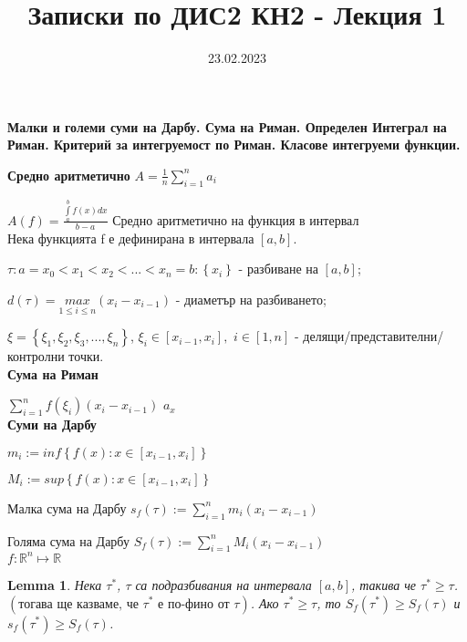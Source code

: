 \documentclass[12pt]{article}
\newtheorem{lemma}{Lemma}
\begin{document}
	\color{white}
	\pagecolor{darkgray}
	\title{Записки по ДИС2 КН2 - Лекция 1}
	\date{23.02.2023}
	\maketitle
	\begin{center}
		\Large
		\textbf{Малки и големи суми на Дарбу. Сума на Риман. Определен Интеграл на Риман. Критерий за интегруемост по Риман. Класове интегруеми функции.}
	\end{center}
	\textbf{Средно аритметично}
	$A=\frac{1}{n}\sum _{i=1}^{n}{a}_{i}$
	
	
	$A\left(f\right)=\frac{\underset{a}{\overset{b}{\int }}f\left(x\right)dx}{b-a} $ Средно аритметично на функция в интервал
	\\
	
	Нека функцията f е дефинирана в интервала $\left[a, b\right]$.
	
	$\tau : a=x_{0}<x_{1}<x_{2}<...<x_{n}=b : \left\{x_{i}\right\}$ - разбиване на $\left[a, b\right]$;
	
	$d\left(\tau\right)=\underset{1\leq i\leq n}{max}\left(x_{i} - x_{i-1}\right)$ - диаметър на разбиването;
	
	$\xi = \left\{\xi_{1}, \xi_{2}, \xi_{3}, ..., \xi _{n}\right\}$, $\xi_{i} \in \left[x_{i-1}, x_{i}\right],$ $i \in \left[1, n\right]$ - делящи/представителни/контролни точки.
	\\ 
	
	\textbf{Сума на Риман}
	
	$\sum _{i=1}^{n} f\left(\xi _{i}\right)\left(x_{i} - x_{i-1}\right)$
	$a_{x}$
	\\
	
	\textbf{Суми на Дарбу}
	
	$m_{i} := inf\left\{f\left(x\right): x\in \left[x_{i-1}, x_{i}\right]\right\}$
	
	$M_{i} := sup\left\{f\left(x\right): x\in \left[x_{i-1}, x_{i}\right]\right\}$
	
	
	Малка сума на Дарбу 
	$s_{f}\left(\tau\right) := \sum _{i=1}^{n} m_{i}\left(x_{i}-x_{i-1}\right)$
	
	Голяма сума на Дарбу
	$S_{f}\left(\tau\right) := \sum _{i=1}^{n} M_{i}\left(x_{i}-x_{i-1}\right)$
	\\
	
	$f: \mathbb{R}^{n} \mapsto \mathbb{R}$
	\begin{lemma}
		Нека $\tau^{*}$, $\tau$ са подразбивания на интервала $\left[a, b\right]$, такива че  $\tau^{*} \geq \tau$. 
		$\left(\text{тогава ще казваме, че }  \tau^{*} \textbf{ е по-фино от } \tau\right)$. 
		Ако $\tau^{*} \geq \tau$, то $S_{f}\left(\tau^{*}\right) \geq S_{f}\left(\tau\right)$ и $s_{f}\left(\tau^{*}\right) \geq S_{f}\left(\tau\right)$.
		\\
	\end{lemma}
	
\end{document}
